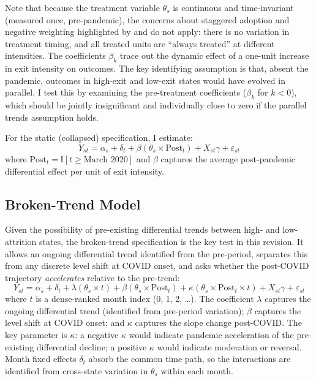 \documentclass[12pt]{article}
\newcommand{\ind}{\mathbb{I}}
\begin{document}
Note that because the treatment variable $\theta_s$ is continuous and time-invariant (measured once, pre-pandemic), the concerns about staggered adoption and negative weighting highlighted by \citet{goodmanbacon2021} and \citet{callaway2021} do not apply: there is no variation in treatment timing, and all treated units are ``always treated'' at different intensities. The coefficients $\beta_k$ trace out the dynamic effect of a one-unit increase in exit intensity on outcomes. The key identifying assumption is that, absent the pandemic, outcomes in high-exit and low-exit states would have evolved in parallel. I test this by examining the pre-treatment coefficients ($\beta_k$ for $k < 0$), which should be jointly insignificant and individually close to zero if the parallel trends assumption holds.

For the static (collapsed) specification, I estimate:
\begin{equation}
Y_{st} = \alpha_s + \delta_t + \beta \left( \theta_s \times \text{Post}_{t} \right) + X_{st} \gamma + \varepsilon_{st}
\label{eq:did}
\end{equation}
where $\text{Post}_t = \ind[t \geq \text{March 2020}]$ and $\beta$ captures the average post-pandemic differential effect per unit of exit intensity.

\subsection{Broken-Trend Model}

Given the possibility of pre-existing differential trends between high- and low-attrition states, the broken-trend specification is the key test in this revision. It allows an ongoing differential trend identified from the pre-period, separates this from any discrete level shift at COVID onset, and asks whether the post-COVID trajectory \textit{accelerates} relative to the pre-trend:
\begin{equation}
Y_{st} = \alpha_s + \delta_t + \lambda \left( \theta_s \times t \right) + \beta \left( \theta_s \times \text{Post}_{t} \right) + \kappa \left( \theta_s \times \text{Post}_{t} \times t \right) + X_{st} \gamma + \varepsilon_{st}
\label{eq:broken_trend}
\end{equation}
where $t$ is a dense-ranked month index (0, 1, 2, \ldots). The coefficient $\lambda$ captures the ongoing differential trend (identified from pre-period variation); $\beta$ captures the level shift at COVID onset; and $\kappa$ captures the slope change post-COVID. The key parameter is $\kappa$: a negative $\kappa$ would indicate pandemic acceleration of the pre-existing differential decline; a positive $\kappa$ would indicate moderation or reversal. Month fixed effects $\delta_t$ absorb the common time path, so the interactions are identified from cross-state variation in $\theta_s$ within each month.
\end{document}
